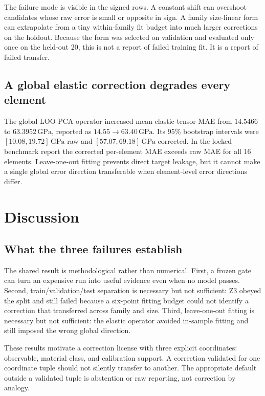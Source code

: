 \documentclass[11pt]{article}
\newcommand{\GPa}{\,\mathrm{GPa}}
\begin{document}
The failure mode is visible in the signed rows. A constant shift can overshoot candidates whose raw error is small or opposite in sign. A family size-linear form can extrapolate from a tiny within-family fit budget into much larger corrections on the holdout. Because the form was selected on validation and evaluated only once on the held-out 20, this is not a report of failed training fit. It is a report of failed transfer.

\subsection{A global elastic correction degrades every element}

The global LOO-PCA operator increased mean elastic-tensor MAE from $14.5466$ to $63.3952\GPa$, reported as $14.55\rightarrow63.40\GPa$. Its 95\% bootstrap intervals were $[10.08,19.72]\GPa$ raw and $[57.07,69.18]\GPa$ corrected. In the locked benchmark report the corrected per-element MAE exceeds raw MAE for all 16 elements. Leave-one-out fitting prevents direct target leakage, but it cannot make a single global error direction transferable when element-level error directions differ.

\section{Discussion}

\subsection{What the three failures establish}

The shared result is methodological rather than numerical. First, a frozen gate can turn an expensive run into useful evidence even when no model passes. Second, train/validation/test separation is necessary but not sufficient: Z3 obeyed the split and still failed because a six-point fitting budget could not identify a correction that transferred across family and size. Third, leave-one-out fitting is necessary but not sufficient: the elastic operator avoided in-sample fitting and still imposed the wrong global direction.

These results motivate a correction license with three explicit coordinates: observable, material class, and calibration support. A correction validated for one coordinate tuple should not silently transfer to another. The appropriate default outside a validated tuple is abstention or raw reporting, not correction by analogy.
\end{document}
